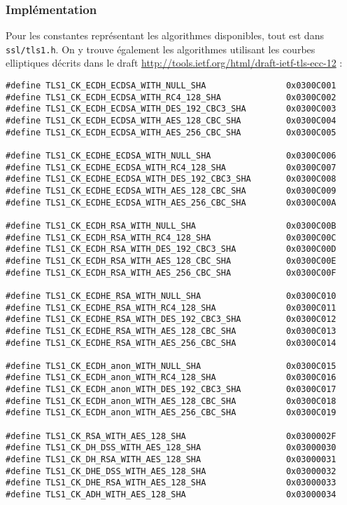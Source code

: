 \subsubsection{Implémentation}

Pour les constantes représentant les algorithmes disponibles, tout est dans \verb+ssl/tls1.h+. On y trouve également les algorithmes utilisant les courbes elliptiques décrits dans le draft \url{http://tools.ietf.org/html/draft-ietf-tls-ecc-12} :

\begin{lstlisting}[style=customc,caption=constantes protocole TLS, label=constantes-TLS]
#define TLS1_CK_ECDH_ECDSA_WITH_NULL_SHA                0x0300C001
#define TLS1_CK_ECDH_ECDSA_WITH_RC4_128_SHA             0x0300C002
#define TLS1_CK_ECDH_ECDSA_WITH_DES_192_CBC3_SHA        0x0300C003
#define TLS1_CK_ECDH_ECDSA_WITH_AES_128_CBC_SHA         0x0300C004
#define TLS1_CK_ECDH_ECDSA_WITH_AES_256_CBC_SHA         0x0300C005

#define TLS1_CK_ECDHE_ECDSA_WITH_NULL_SHA               0x0300C006
#define TLS1_CK_ECDHE_ECDSA_WITH_RC4_128_SHA            0x0300C007
#define TLS1_CK_ECDHE_ECDSA_WITH_DES_192_CBC3_SHA       0x0300C008
#define TLS1_CK_ECDHE_ECDSA_WITH_AES_128_CBC_SHA        0x0300C009
#define TLS1_CK_ECDHE_ECDSA_WITH_AES_256_CBC_SHA        0x0300C00A

#define TLS1_CK_ECDH_RSA_WITH_NULL_SHA                  0x0300C00B
#define TLS1_CK_ECDH_RSA_WITH_RC4_128_SHA               0x0300C00C
#define TLS1_CK_ECDH_RSA_WITH_DES_192_CBC3_SHA          0x0300C00D
#define TLS1_CK_ECDH_RSA_WITH_AES_128_CBC_SHA           0x0300C00E
#define TLS1_CK_ECDH_RSA_WITH_AES_256_CBC_SHA           0x0300C00F

#define TLS1_CK_ECDHE_RSA_WITH_NULL_SHA                 0x0300C010
#define TLS1_CK_ECDHE_RSA_WITH_RC4_128_SHA              0x0300C011
#define TLS1_CK_ECDHE_RSA_WITH_DES_192_CBC3_SHA         0x0300C012
#define TLS1_CK_ECDHE_RSA_WITH_AES_128_CBC_SHA          0x0300C013
#define TLS1_CK_ECDHE_RSA_WITH_AES_256_CBC_SHA          0x0300C014

#define TLS1_CK_ECDH_anon_WITH_NULL_SHA                 0x0300C015
#define TLS1_CK_ECDH_anon_WITH_RC4_128_SHA              0x0300C016
#define TLS1_CK_ECDH_anon_WITH_DES_192_CBC3_SHA         0x0300C017
#define TLS1_CK_ECDH_anon_WITH_AES_128_CBC_SHA          0x0300C018
#define TLS1_CK_ECDH_anon_WITH_AES_256_CBC_SHA          0x0300C019

#define TLS1_CK_RSA_WITH_AES_128_SHA                    0x0300002F
#define TLS1_CK_DH_DSS_WITH_AES_128_SHA                 0x03000030
#define TLS1_CK_DH_RSA_WITH_AES_128_SHA                 0x03000031
#define TLS1_CK_DHE_DSS_WITH_AES_128_SHA                0x03000032
#define TLS1_CK_DHE_RSA_WITH_AES_128_SHA                0x03000033
#define TLS1_CK_ADH_WITH_AES_128_SHA                    0x03000034


\end{lstlisting}
